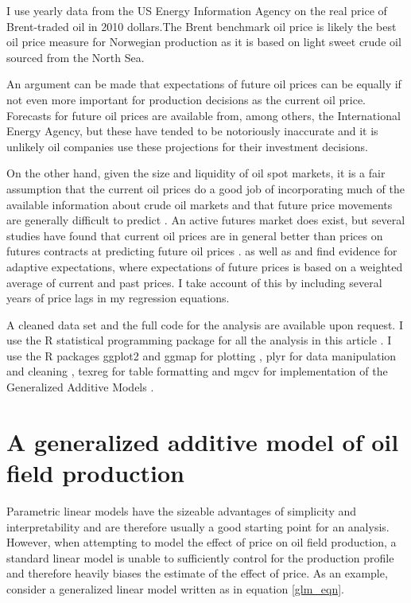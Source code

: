 \documentclass[12pt]{article}
\begin{document}
I use yearly data from the US Energy Information Agency on the real price of Brent-traded oil in 2010 dollars.The Brent benchmark oil price is likely the best oil price measure for Norwegian production as it is based on light sweet crude oil sourced from the North Sea.  

An argument can be made that expectations of future oil prices can be equally if not even more important for production decisions as the current oil price.  Forecasts for future oil prices are available from, among others, the International Energy Agency, but these have tended to be notoriously inaccurate and it is unlikely oil companies use these projections for their investment decisions.  

On the other hand, given the size and liquidity of oil spot markets, it is a fair assumption that the current oil prices do a good job of incorporating much of the available information about crude oil markets and that future price movements are generally difficult to predict \citep{hamilton_understanding_2008}.  An active futures market does exist, but several studies have found that current oil prices are in general better than prices on futures contracts at predicting future oil prices \citep{alquist_what_2010, chinn_predictive_2005}.  \citet{mohn_investment_2008} as well as \citet{pesaran_econometric_1990} and \citet{farzin_impact_2001} find evidence for adaptive expectations, where expectations of future prices is based on a weighted average of current and past prices.  I take account of this by including several years of price lags in my regression equations.  

A cleaned data set and the full code for the analysis are available upon request. I use the R statistical programming package for all the analysis in this article \citep{r_core_team_r:_2013}.  I use the R packages ggplot2 and ggmap for plotting \citep{wickham_ggplot2:_2009, kahle_ggmap:_2013}, plyr for data manipulation and cleaning \citep{wickham_split-apply-combine_2011}, texreg for table formatting \citep{leifeld_texreg:_2013} and mgcv for implementation of the Generalized Additive Models \citep{wood_fast_2011}.

\section{A generalized additive model of oil field production}
Parametric linear models have the sizeable advantages of simplicity and interpretability and are therefore usually a good starting point for an analysis.  However, when attempting to model the effect of price on oil field production, a standard linear model is unable to sufficiently control for the production profile and therefore heavily biases the estimate of the effect of price.  As an example, consider a generalized linear model written as in equation \ref{glm_eqn}. 
\end{document}
